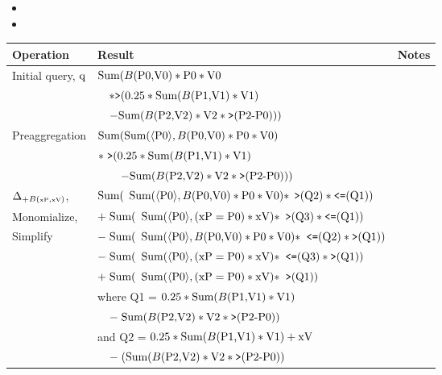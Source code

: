 \begin{figure*}
\begin{itemize}
\item {}
\item {}
\end{itemize}
\begin{tabular}{l|l|l}
Operation & Result & Notes \\
\hline 
Initial query, $\mbox{q}$
    & $\mbox{Sum}(B(\mbox{P0,V0}) * \mbox{P0} * \mbox{V0}$
    &
\\
    & $\quad * \mbox{{\tt >}}(0.25 * \mbox{Sum}(B(\mbox{P1,V1}) * \mbox{V1})$
    &
\\
    & $\quad - \mbox{Sum}(B(\mbox{P2,V2}) * \mbox{V2} * \mbox{{\tt >}}(\mbox{P2-P0})))$
    &
\\[1.5ex]
Preaggregation
    & $\mbox{Sum}(
       \mbox{Sum}({\langle\mbox{P0}\rangle}, B(\mbox{P0,V0}) * \mbox{P0} * \mbox{V0})$
    & 
\\
    & $* \; \mbox{{\tt >}}(0.25 * \mbox{Sum}(B(\mbox{P1,V1}) * \mbox{V1})$
    &
\\
    & $\qquad - \mbox{Sum}(B(\mbox{P2,V2}) * \mbox{V2} * \mbox{{\tt >}}(\mbox{P2-P0})))$
    & 
\\[1.5ex]
$\Delta_{+B(\v{\tiny{xP}},\v{\tiny{xV}})}$,
    & $\mbox{Sum}($
      $\mbox{Sum}({\langle\mbox{P0}\rangle}, B(\mbox{P0,V0}) * \mbox{P0} * \mbox{V0}) * $
      $\mbox{{\tt >}}(\mbox{Q2}) * \mbox{{\tt <=}}(\mbox{Q1}))$
    &
\\
Monomialize,
    & $+ \; \mbox{Sum}($
      $\mbox{Sum}({\langle\mbox{P0}\rangle}, (\mbox{xP} = \mbox{P0}) * \mbox{xV}) * $
      $\mbox{{\tt >}}(\mbox{Q3}) * \mbox{{\tt <=}}(\mbox{Q1}))$
    &
\\
Simplify
    & $ - \; \mbox{Sum}($
      $\mbox{Sum}({\langle\mbox{P0}\rangle}, B(\mbox{P0,V0}) * \mbox{P0} * \mbox{V0}) * $
      $\mbox{{\tt <=}}(\mbox{Q2}) * \mbox{{\tt >}}(\mbox{Q1}))$
    &
\\
    & $ - \; \mbox{Sum}($
      $\mbox{Sum}({\langle\mbox{P0}\rangle}, (\mbox{xP} = \mbox{P0}) * \mbox{xV}) * $
      $\mbox{{\tt <=}}(\mbox{Q3}) * \mbox{{\tt >}}(\mbox{Q1}))$
    &
\\
    & $+ \; \mbox{Sum}($
      $\mbox{Sum}({\langle\mbox{P0}\rangle}, (\mbox{xP} = \mbox{P0}) * \mbox{xV}) * $
      $\mbox{{\tt >}}(\mbox{Q1}))$
    &
\\[1ex]
    & where Q1 =
      $0.25 * \mbox{Sum}(B(\mbox{P1,V1}) * \mbox{V1})$ 
    &
\\
    & $\quad - \; \mbox{Sum}(B(\mbox{P2,V2}) * \mbox{V2} * \mbox{{\tt >}}(\mbox{P2-P0}))$
    &
\\
    & and Q2 =
      $0.25 * \mbox{Sum}(B(\mbox{P1,V1}) * \mbox{V1}) + \mbox{xV}$ 
    &
\\
    & $\quad - \; (\mbox{Sum}(B(\mbox{P2,V2}) * \mbox{V2} * \mbox{{\tt >}}(\mbox{P2-P0}))$

\end{tabular}
\end{figure*}
